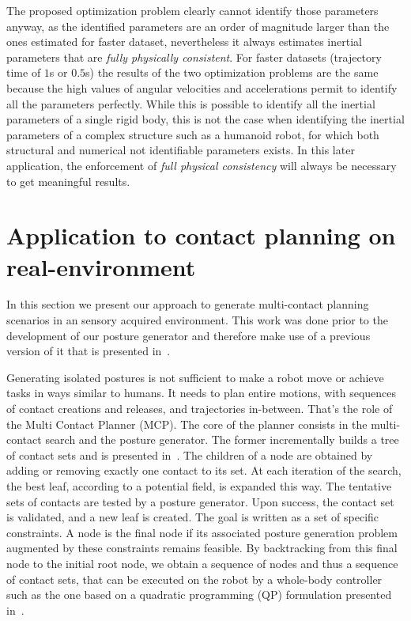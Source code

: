 \FloatBarrier
The proposed optimization problem clearly cannot identify those parameters anyway, as the identified parameters are an order of magnitude larger than the ones estimated for faster dataset, nevertheless it always estimates inertial parameters that are \emph{fully physically consistent}.
For faster datasets (trajectory time of $1$s or $0.5$s) the results of the two optimization problems are the same because the high values of angular velocities and accelerations permit to identify all the parameters perfectly.
While this is possible to identify all the inertial parameters of a single rigid body, this is not the case when identifying the inertial parameters of a complex structure such as a humanoid robot, for which both structural \cite{ayusawa2014identifiability} and numerical \cite{pham1991essential} not identifiable parameters exists.
In this later application, the enforcement of \emph{full physical consistency}  will always be necessary to get meaningful results.

\section{Application to contact planning on real-environment}
\label{sec:application_of_contact_planning_on_real_environment}

In this section we present our approach to generate multi-contact planning scenarios in an sensory acquired environment. This work was done prior to the development of our posture generator and therefore make use of a previous version of it that is presented in~\cite{bouyarmane:humanoids:2010}.

Generating isolated postures is not sufficient to make a robot move or achieve tasks in ways similar to humans.
It needs to plan entire motions, with sequences of contact creations and releases, and trajectories in-between.
That's the role of the Multi Contact Planner (MCP).
The core of the planner consists in the multi-contact search and the posture generator.
The former incrementally builds a tree of contact sets and is presented in~\cite{escande:ras:2013}.
The children of a node are obtained by adding or removing exactly one contact to its set.
At each iteration of the search, the best leaf, according to a potential field, is expanded this way.
The tentative sets of contacts are tested by a posture generator.
Upon success, the contact set is validated, and a new leaf is created.
The goal is written as a set of specific constraints.
A node is the final node if its associated posture generation problem augmented by these constraints remains feasible.
By backtracking from this final node to the initial root node, we obtain a sequence of nodes and thus a sequence of contact sets, that can be executed on the robot by a whole-body controller such as the one based on a quadratic programming (QP) formulation presented in~\cite{bouyarmane:iros:2011}.

